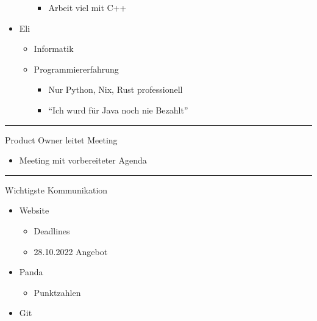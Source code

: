 \begin{itemize}
\begin{itemize}
    \begin{itemize}
    \tightlist
    \item
      Arbeit viel mit C++
    \end{itemize}
  \end{itemize}
\item
  Eli

  \begin{itemize}
  \tightlist
  \item
    Informatik
  \item
    Programmiererfahrung

    \begin{itemize}
    \tightlist
    \item
      Nur Python, Nix, Rust professionell
    \item
      ``Ich wurd für Java noch nie Bezahlt''
    \end{itemize}
  \end{itemize}
\end{itemize}

\begin{center}\rule{0.5\linewidth}{0.5pt}\end{center}

Product Owner leitet Meeting

\begin{itemize}
\tightlist
\item
  Meeting mit vorbereiteter Agenda
\end{itemize}

\begin{center}\rule{0.5\linewidth}{0.5pt}\end{center}

Wichtigste Kommunikation

\begin{itemize}
\tightlist
\item
  Website

  \begin{itemize}
  \tightlist
  \item
    Deadlines
  \item
    28.10.2022 Angebot
  \end{itemize}
\item
  Panda

  \begin{itemize}
  \tightlist
  \item
    Punktzahlen
  \end{itemize}
\item
  Git
\end{itemize}

